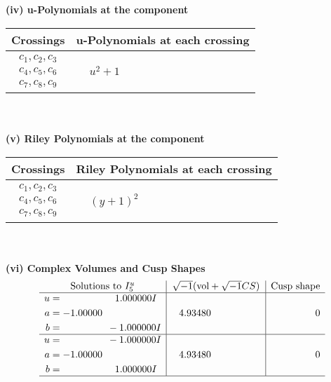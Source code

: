 \documentclass[1p]{elsarticle_modified}
\theoremstyle{definition}
\newcommand{\I}{\sqrt{-1}}
\begin{document}
\newpage\renewcommand{\arraystretch}{1}
\flushleft \textbf{(iv) u-Polynomials at the component}\newline \\
\begin{tabular}{m{50pt}|m{274pt}}
Crossings & \hspace{64pt}u-Polynomials at each crossing \\
\hline $$\begin{aligned}c_{1},c_{2},c_{3}\\c_{4},c_{5},c_{6}\\c_{7},c_{8},c_{9}\end{aligned}$$&$\begin{aligned}
&u^2+1
\end{aligned}$\\
\hline
\end{tabular}\\~\\
\newpage\renewcommand{\arraystretch}{1}
\flushleft \textbf{(v) Riley Polynomials at the component}\newline \\
\begin{tabular}{m{50pt}|m{274pt}}
Crossings & \hspace{64pt}Riley Polynomials at each crossing \\
\hline $$\begin{aligned}c_{1},c_{2},c_{3}\\c_{4},c_{5},c_{6}\\c_{7},c_{8},c_{9}\end{aligned}$$&$\begin{aligned}
&(y+1)^2
\end{aligned}$\\
\hline
\end{tabular}\\~\\
\newpage\flushleft \textbf{(vi) Complex Volumes and Cusp Shapes}
$$\begin{array}{c|c|c}  
\text{Solutions to }I^u_{5}& \I (\text{vol} + \sqrt{-1}CS) & \text{Cusp shape}\\
 \hline 
\begin{aligned}
u &= \phantom{-0.000000 -}1.000000 I \\
a &= -1.00000\phantom{ +0.000000I} \\
b &= \phantom{-0.000000 } -1.000000 I\end{aligned}
 & \phantom{-}4.93480\phantom{ +0.000000I} & \phantom{-0.000000 } 0 \\ \hline\begin{aligned}
u &= \phantom{-0.000000 } -1.000000 I \\
a &= -1.00000\phantom{ +0.000000I} \\
b &= \phantom{-0.000000 -}1.000000 I\end{aligned}
 & \phantom{-}4.93480\phantom{ +0.000000I} & \phantom{-0.000000 } 0\\
 \hline 
 \end{array}$$\newpage
\end{document}
